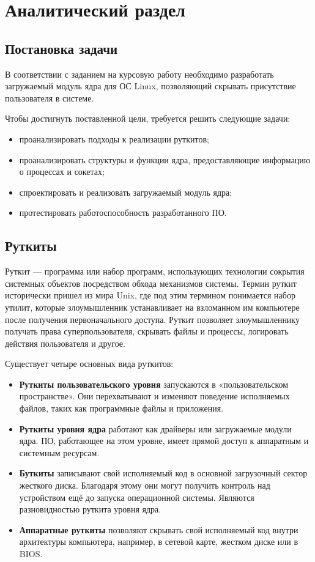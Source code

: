 \chapter{Аналитический раздел}

\section{Постановка задачи} 

В соответствии с заданием на курсовую работу необходимо разработать загружаемый модуль ядра для ОС Linux, позволяющий скрывать присутствие пользователя в системе.

Чтобы достигнуть поставленной цели, требуется решить следующие задачи:

\begin{itemize}
    \item проанализировать подходы к реализации руткитов;
    \item проанализировать структуры и функции ядра, предоставляющие информацию о процессах и сокетах; 
    \item спроектировать и реализовать загружаемый модуль ядра;
    \item протестировать работоспособность разработанного ПО.
\end{itemize}


\section{Руткиты} 

Руткит --- программа или набор программ, использующих технологии сокрытия системных объектов посредством обхода механизмов системы.
Термин руткит исторически пришел из мира Unix, где под этим термином понимается набор утилит, которые злоумышленник устанавливает на взломанном им компьютере после получения первоначального доступа. Руткит позволяет злоумышленнику получать права суперпользователя, скрывать файлы и процессы, логировать действия пользователя и другое. 

Существует четыре основных вида руткитов:

\begin{itemize}
	\item \textbf{Руткиты пользовательского уровня} запускаются в «пользовательском пространстве». Они перехватывают и изменяют поведение исполняемых файлов, таких как программные файлы и приложения.
	\item \textbf{Руткиты уровня ядра} работают как драйверы или загружаемые модули ядра. ПО, работающее на этом уровне, имеет прямой доступ к аппаратным и системным ресурсам.
	\item \textbf{Буткиты} записывают свой исполняемый код в основной загрузочный сектор жесткого диска. Благодаря этому они могут получить контроль над устройством ещё до запуска операционной системы. Являются разновидностью руткита уровня ядра.
	\item \textbf{Аппаратные руткиты} позволяют скрывать свой исполняемый код внутри архитектуры компьютера, например, в сетевой карте, жестком диске или в BIOS.
\end{itemize}



